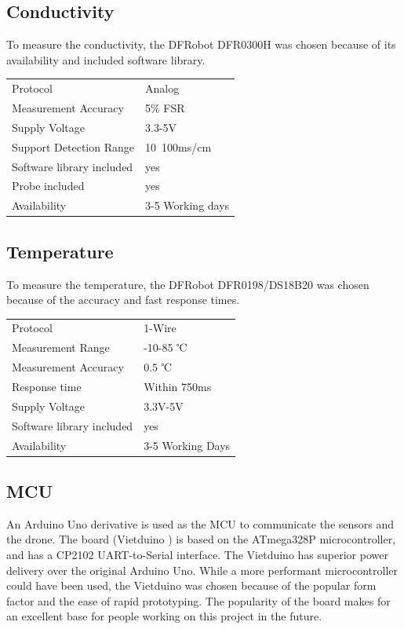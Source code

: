 \subsection{Conductivity}
To measure the conductivity, the DFRobot DFR0300H \cite{DFR0300H} was chosen because of its availability and included software library.
\begin{table}[h!]
	\centering
	\quad
	\begin{tabular}{| l | l |}
    \hline
    Protocol & Analog\\
    Measurement Accuracy &  5\% FSR\\
    Supply Voltage & 3.3-5V\\
    Support Detection Range & 10~100ms/cm\\
    Software library included & yes \\
    Probe included & yes \\
    Availability & 3-5 Working days \\
    \hline
	\end{tabular}
\end{table}

\newpage
\subsection{Temperature}
To measure the temperature, the DFRobot DFR0198/DS18B20 \cite{DFR0198} was chosen because of the accuracy and fast response times.
\begin{table}[h!]
	\centering
	\quad
	\begin{tabular}{| l | l |}
    \hline
    Protocol & 1-Wire\\
    Measurement Range & -10-85 ℃ \\
    Measurement Accuracy &  0.5 ℃ \\
    Response time & Within 750ms \\
    Supply Voltage & 3.3V-5V \\
    Software library included & yes \\
    Availability & 3-5 Working Days \\
    \hline
	\end{tabular}
\end{table}

\subsection{MCU}
An Arduino Uno derivative is used as the MCU to communicate the sensors and the drone. The board  (Vietduino \cite{vietduino}) is based on the ATmega328P microcontroller, and has a CP2102 UART-to-Serial interface. The Vietduino has superior power delivery over the original Arduino Uno. While a more performant microcontroller could have been used, the Vietduino was chosen because of the popular form factor and the ease of rapid prototyping. The popularity of the board makes for an excellent base for people working on this project in the future.

